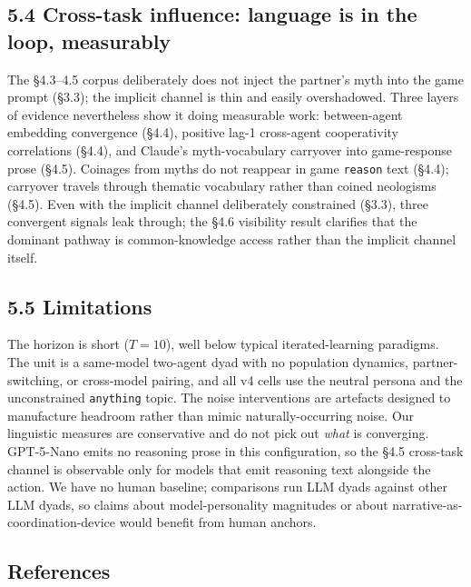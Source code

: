 \documentclass[
  10pt,
  letterpaper,
]{article}
\begin{document}
\subsection{5.4 Cross-task influence: language is in the loop,
measurably}\label{cross-task-influence-language-is-in-the-loop-measurably}

The §4.3--4.5 corpus deliberately does not inject the partner's myth
into the game prompt (§3.3); the implicit channel is thin and easily
overshadowed. Three layers of evidence nevertheless show it doing
measurable work: between-agent embedding convergence (§4.4), positive
lag-1 cross-agent cooperativity correlations (§4.4), and Claude's
myth-vocabulary carryover into game-response prose (§4.5). Coinages from
myths do not reappear in game \texttt{reason} text (§4.4); carryover
travels through thematic vocabulary rather than coined neologisms
(§4.5). Even with the implicit channel deliberately constrained (§3.3),
three convergent signals leak through; the §4.6 visibility result
clarifies that the dominant pathway is common-knowledge access rather
than the implicit channel itself.

\subsection{5.5 Limitations}\label{limitations}

The horizon is short (\(T = 10\)), well below typical iterated-learning
paradigms. The unit is a same-model two-agent dyad with no population
dynamics, partner-switching, or cross-model pairing, and all v4 cells
use the neutral persona and the unconstrained \texttt{anything} topic.
The noise interventions are artefacts designed to manufacture headroom
rather than mimic naturally-occurring noise. Our linguistic measures are
conservative and do not pick out \emph{what} is converging. GPT-5-Nano
emits no reasoning prose in this configuration, so the §4.5 cross-task
channel is observable only for models that emit reasoning text alongside
the action. We have no human baseline; comparisons run LLM dyads against
other LLM dyads, so claims about model-personality magnitudes or about
narrative-as-coordination-device would benefit from human anchors.

\subsection*{References}\label{references}
\end{document}
